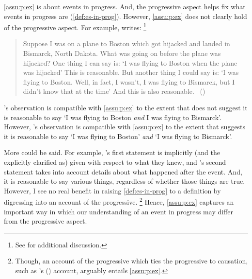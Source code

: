 \begin{note}
  \autoref{assu:p:ex} is about events in progress.
  And, the progressive aspect helps fix what events in progress are (\autoref{def:es-in-prog}).
  However, \autoref{assu:p:ex} does not clearly hold of the progressive aspect.
  For example, \citeauthor{Landman:1992wh} writes:%
  \footnote{
    See \textcite{Bonomi:1997uq} for additional discussion.
  }

  \begin{quote}
    Suppose I was on a plane to Boston which got hijacked and landed in Bismarck, North Dakota.
    What was going on before the plane was hijacked?
    One thing I can say is:
    `I was flying to Boston when the plane was hijacked'
    This is reasonable.
    But another thing I could say is:
    `I was flying to Boston.
    Well, in fact, I wasn't, I was flying to Bismarck, but I didn't know that at the time'
    And this is also reasonable.%
    \mbox{ }\hfill\mbox{(\citeyear[30--31]{Landman:1992wh})}
  \end{quote}
  \citeauthor{Landman:1992wh}'s observation is compatible with \autoref{assu:p:ex} to the extent that \citeauthor{Landman:1992wh} does not suggest it is reasonable to say `I was flying to Boston \emph{and} I was flying to Bismarck'.
  However, \citeauthor{Landman:1992wh}'s observation is compatible with \autoref{assu:p:ex} to the extent that \citeauthor{Landman:1992wh} suggests it is reasonable to say `I was flying to Boston' \emph{and} `I was flying to Bismarck'.

  More could be said.
  For example, \citeauthor{Landman:1992wh}'s first statement is implicitly (and the explicitly clarified as) given with respect to what they knew, and \citeauthor{Landman:1992wh}'s second statement takes into account details about what happened after the event.
  And, it is reasonable to say various things, regardless of whether those things are true.
  However, I see no real benefit in raising \autoref{def:es-in-prog} to a definition by digressing into an account of the progressive.%
  \footnote{
    Though, an account of the progressive which ties the progressive to causation, such as \citeauthor{Szabo:2004ul}'s (\citeyear{Szabo:2004ul}) account, arguably entails \autoref{assu:p:ex}.
  }
  Hence, \autoref{assu:p:ex} captures an important way in which our understanding of an event in progress may differ from the progressive aspect.
\end{note}





